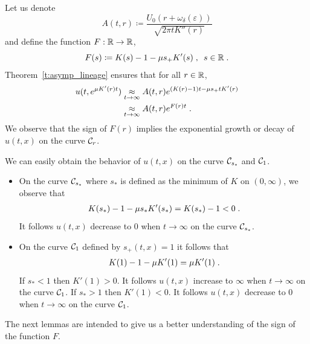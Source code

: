 \documentclass[11pt]{amsart}
\begin{document}
Let us denote $$A(t,r) \coloneqq \frac{U_0(r+\omega_\delta(\varepsilon))}{\sqrt{2\pi tK''(r)}}$$ and define the function $F : \mathbb{R} \to \mathbb{R}$, 
\begin{equation}
    \label{eq:DET91}
    F(s) \coloneqq K(s)-1 -  \mu s_+ K'(s)
    \; , \enspace s \in \mathbb{R} 
    \; .
\end{equation}
Theorem~\ref{t:asymp_lineage} ensures that for all $r \in \mathbb{R}$, 
    \begin{align*}
        u(t,e^{\mu K'(r)t})
        &\underset{t \to \infty}{\approx}
        A(t,r) e^{(K(r)-1)t -  \mu s_+ t K'(r)} \\
        &\underset{t \to \infty}{\approx} A(t,r) e^{F(r)t}
        \; .
    \end{align*}
We observe that the sign of $F(r)$ implies the exponential growth or decay of $u(t, x)$ on the curve $\mathcal{C}_{r}$. \\

    \begin{remark}We can easily obtain the behavior of $u(t,x)$ on the curve $\mathcal{C}_{s_*}$ and $\mathcal{C}_1$.
    \begin{itemize}
        \item On the curve $\mathcal{C}_{s_*}$ where $s_*$ is defined as the minimum of $K$ on $(0, \infty)$, we observe that 
        \begin{align*}
            K(s_*)-1 -  \mu s_* K'(s_*) = K(s_*)-1 < 0
            \; .
        \end{align*}
        It follows $u(t, x)$ decrease to $0$ when $t \to \infty$ on the curve $\mathcal{C}_{s_*}$. 
        \item On the curve $\mathcal{C}_{1}$ defined by $s_+(t, x) = 1$ it follows that 
        \begin{align*}
            K(1)-1 -  \mu K'(1) = \mu K'(1)
            \; .
        \end{align*}
        If $s_* < 1$ then $K'(1) > 0$. 
        It follows $u(t, x)$ increase to $\infty$ when $t \to \infty$ on the curve $\mathcal{C}_{1}$.  If $s_* > 1$ then $K'(1) < 0$. 
        It follows $u(t, x)$ decrease to $0$ when $t \to \infty$ on the curve $\mathcal{C}_{1}$. 
    \end{itemize}
    \end{remark}

    The next lemmas are intended to give us a better understanding of the sign of the function $F$. 
\end{document}
